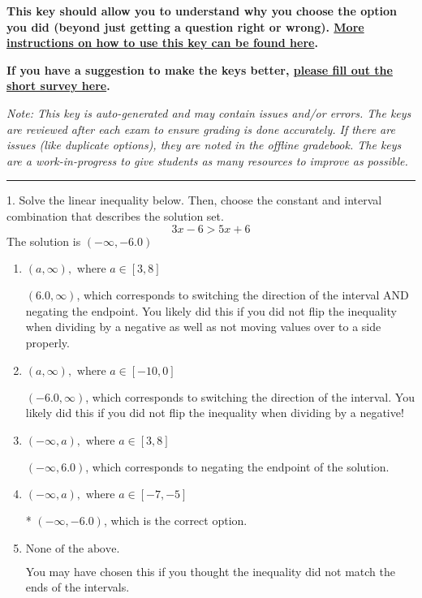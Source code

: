 \documentclass{extbook}[14pt]
\begin{document}
\textbf{This key should allow you to understand why you choose the option you did (beyond just getting a question right or wrong). \href{https://xronos.clas.ufl.edu/mac1105spring2020/courseDescriptionAndMisc/Exams/LearningFromResults}{More instructions on how to use this key can be found here}.}

\textbf{If you have a suggestion to make the keys better, \href{https://forms.gle/CZkbZmPbC9XALEE88}{please fill out the short survey here}.}

\textit{Note: This key is auto-generated and may contain issues and/or errors. The keys are reviewed after each exam to ensure grading is done accurately. If there are issues (like duplicate options), they are noted in the offline gradebook. The keys are a work-in-progress to give students as many resources to improve as possible.}

\rule{\textwidth}{0.4pt}

1. Solve the linear inequality below. Then, choose the constant and interval combination that describes the solution set.
\[ 3x -6 > 5x + 6 \] 
The solution is $ (-\infty, -6.0) $ 

\begin{enumerate}[label=\Alph*.] 
\item $ (a, \infty), \text{ where } a \in [3, 8] $ 

  $(6.0, \infty)$, which corresponds to switching the direction of the interval AND negating the endpoint. You likely did this if you did not flip the inequality when dividing by a negative as well as not moving values over to a side properly. 
\item $ (a, \infty), \text{ where } a \in [-10, 0] $ 

  $(-6.0, \infty)$, which corresponds to switching the direction of the interval. You likely did this if you did not flip the inequality when dividing by a negative! 
\item $ (-\infty, a), \text{ where } a \in [3, 8] $ 

  $(-\infty, 6.0)$, which corresponds to negating the endpoint of the solution. 
\item $ (-\infty, a), \text{ where } a \in [-7, -5] $ 

 * $(-\infty, -6.0)$, which is the correct option. 
\item $ \text{None of the above}. $ 

 You may have chosen this if you thought the inequality did not match the ends of the intervals. 
\end{enumerate} 
 
\end{document}
